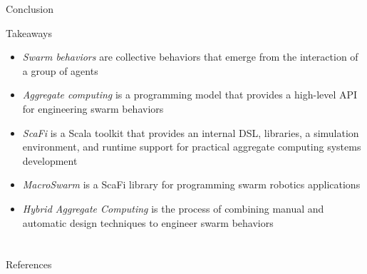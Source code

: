 \documentclass[presentation, 9pt]{beamer}\mode<presentation>{\usetheme{AMSBolognaFC}}
\begin{document}
\begin{frame}{Conclusion}
	\begin{alertblock}{Takeaways}
		\begin{itemize}
			\item \emph{Swarm behaviors} are collective behaviors that emerge from the interaction of a group of agents
			\item \emph{Aggregate computing} is a programming model that provides a high-level API for engineering swarm behaviors
			\item \emph{ScaFi} is a Scala toolkit that provides an internal DSL, libraries, a simulation environment, and runtime support for practical aggregate computing systems development
			\item \emph{MacroSwarm} is a ScaFi library for programming swarm robotics applications
			\item \emph{Hybrid Aggregate Computing} is the process of combining manual and automatic design techniques to engineer swarm behaviors
		\end{itemize}
	\end{alertblock}
\end{frame}

\frame{\titlepage}

\section*{\refname}

\begin{frame}[allowframebreaks]{References}
\def\bibfont{\footnotesize}
\printbibliography
\end{frame}

\end{document}
